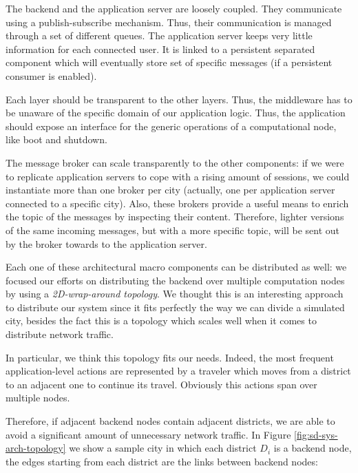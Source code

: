 The backend and
the application server are loosely coupled. They communicate using a
publish-subscribe mechanism. Thus, their
communication is managed through a set of different queues.
The application server keeps very little information for
each connected user. It is linked to a persistent separated component
which will eventually store set of specific messages
(if a persistent consumer is enabled).


Each layer should be transparent to the other layers. Thus,
the middleware has to be unaware
of the specific domain of our application logic.
Thus, the application should expose an interface for the generic operations of
a computational node, like boot and shutdown.


The message broker can scale transparently to the other components: if we
were to replicate application servers to cope with a rising amount of
sessions, we could instantiate more than one broker per city (actually, one
per application server connected to a specific city).
Also, these brokers provide a useful means to enrich the topic of the messages
by inspecting their content. Therefore, lighter versions of the
same incoming messages, but with a more specific topic, will be sent out by the
broker towards to the application server.

Each one of these architectural macro components can be distributed as well: we
focused our efforts on distributing the backend over multiple computation nodes
by using a \textit{2D-wrap-around topology}.
We thought this is an interesting approach to distribute our system since it
fits perfectly the way we can divide a simulated city, besides the fact this is
a topology which scales well when it comes to distribute network traffic.

In particular, we think this topology fits our needs. Indeed, the
most frequent application-level actions are
represented by a traveler which moves from a district to an
adjacent one to continue its travel. Obviously this actions span over
multiple nodes.

Therefore, if adjacent backend nodes contain adjacent districts, we are able to
avoid a significant amount of unnecessary network traffic. In Figure
\ref{fig:sd-sys-arch-topology} we show a sample city in which each district
$D_i$ is a backend node, the edges starting from each district are the links
between backend nodes:

